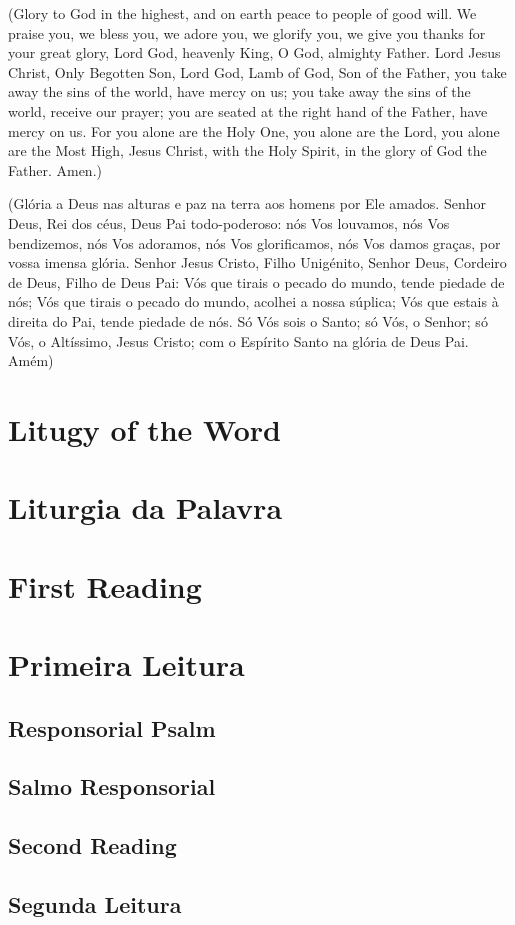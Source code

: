 \documentclass[10pt,a5]{article}
\newcommand \sect[2] {\section*{#1} \switchcolumn \section*{#2} \switchcolumn*}
\newcommand \subsect[2] {\subsection*{#1} \switchcolumn \subsection*{#2} \switchcolumn*}
\begin{document}
\begin{paracol}{2}

(Glory to God in the highest,
and on earth peace to people
of good will.
We praise you, we bless you,
we adore you, we glorify you,
we give you thanks for your great
glory,
Lord God, heavenly King, O God,
almighty Father.
Lord Jesus Christ, Only Begotten Son,
Lord God, Lamb of God, Son of the
Father,
you take away the sins of the world,
have mercy on us;
you take away the sins of the world,
receive our prayer;
you are seated at the right hand
of the Father, have mercy on us.
For you alone are the Holy One,
you alone are the Lord,
you alone are the Most High,
Jesus Christ, with the Holy Spirit,
in the glory of God the Father. Amen.)

\switchcolumn

(Gl\'oria a Deus nas alturas e paz na terra aos homens por Ele amados.
 Senhor Deus, Rei dos c\'eus, Deus Pai todo-poderoso:
 n\'os Vos louvamos, n\'os Vos bendizemos, n\'os Vos adoramos, n\'os Vos glorificamos,
 n\'os Vos damos graças, por vossa imensa gl\'oria.
 Senhor Jesus Cristo, Filho Unig\'enito, Senhor Deus, Cordeiro de Deus, Filho de Deus Pai:
 V\'os que tirais o pecado do mundo, tende piedade de n\'os;
 V\'os que tirais o pecado do mundo, acolhei a nossa s\'uplica;
 V\'os que estais \`a direita do Pai, tende piedade de n\'os.
 S\'o V\'os sois o Santo;
 s\'o V\'os, o Senhor;
 s\'o V\'os, o Alt\'issimo, Jesus Cristo;
 com o Esp\'irito Santo na gl\'oria de Deus Pai.
 Am\'em)

 \switchcolumn*

 \sect{Litugy of the Word}{Liturgia da Palavra}

 \sect{First Reading}{Primeira Leitura}

 \lipsum[3]


 \switchcolumn

 \lipsum[3]


 \switchcolumn*

 \subsect{Responsorial Psalm}{Salmo Responsorial}

 \lipsum[1]

 \switchcolumn

 \lipsum[1]

 \switchcolumn*

 \subsect{Second Reading}{Segunda Leitura}

 \lipsum[3]



\end{paracol}
\end{document}
